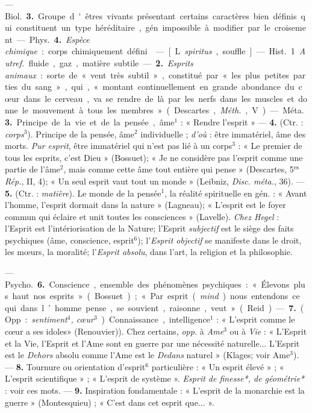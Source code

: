 \begin{itemize}[leftmargin=1cm, label=, itemsep=1pt]
— \si{Biol.} {\bf 3.} Groupe d'êtres vivants
présentant certains caractères bien
définis qui constituent un type
héréditaire, gén. impossible à modifier par le croisement.

— \si{Phys.} {\bf 4.} {\it Espèce chimique} :
corps chimiquement défini.

 — [L. {\it spiritus}, souffle] — \si{Hist.}
1. {\it Autref.} fluide, gaz, matière
subtile. — {\bf 2.} {\it Esprits animaux} : sorte
de « vent très subtil », constitué
par « les plus petites parties du
sang », qui, « montant continuellement en grande abondance du
cœur dans le cerveau, va se rendre
de là par les nerfs dans les muscles
et donne le mouvement à tous les
membres » (Descartes, {\it Méth.}, V).

— \si{Méta.} {\bf 3.} Principe de la vie et de
la pensée, âme$^1$ : « Rendre l'esprit »
— {\bf 4.} (Ctr. : {\it corps}$^3$). Principe de la
pensée, âme$^2$ individuelle ; {\it d'où} :
être immatériel, âme des morts.
{\it Pur esprit}, être immatériel qui n’est
pas lié à un corps$^3$ : « Le premier de
tous les esprits, c’est Dieu » (Bossuet); « Je ne considère pas l'esprit
comme une partie de l'âme$^2$, mais
comme cette âme tout entière qui
pense » (Descartes, 5$^\text{es}$ {\it Rép.}, II, 4);
« Un seul esprit vaut tout un monde »
(Leibniz, {\it Disc. méta.}, 36). — {\bf 5.} (Ctr. :
{\it matière}). Le monde de la pensée$^1$, la
réalité spirituelle en gén. : « Avant
l’homme, l'esprit dormait dans la
nature » (Lagneau); « L'esprit est
le foyer commun qui éclaire et unit
toutes les consciences » (Lavelle).
{\it Chez Hegel} : l'Esprit est l’intériorisation
de la Nature; l'Esprit {\it subjectif} est le siège des faits psychiques
(âme, conscience, esprit$^6$); l'{\it Esprit objectif} se manifeste
dans le droit, les mœurs, la moralité; l'{\it Esprit absolu}, dans l’art,
la religion et la philosophie.

— \si{Psycho.} {\bf 6.} Conscience, ensemble des phénomènes psychiques :
« Élevons plus haut nos esprits »
(Bossuet); « Par esprit ({\it mind}) nous
entendons ce qui dans l’homme
pense, se souvient, raisonne, veut »
(Reid). — {\bf 7.} (Opp. : {\it sentiment$^4$,
cœur$^3$}). Connaissance, intelligence$^1$ :
« L'esprit comme le cœur a ses idoles»
(Renouvier)). Chez certains, {\it opp.} à
{\it Ame}$^3$ ou à {\it Vie} : « L'Esprit et la Vie,
l'Esprit et l'Ame sont en guerre par
une nécessité naturelle... L'Esprit
est le {\it Dehors} absolu comme l’Ame
est le {\it Dedans} naturel » (Klages;
voir Ame$^3$). — {\bf 8.} Tournure ou orientation d’esprit$^6$
particulière : « Un esprit élevé » ; « L'esprit scientifique » ;
« L'esprit de système ». {\it Esprit de finesse*, de géométrie*} :
voir ces mots. — {\bf 9.} Inspiration fondamentale : « L’esprit de la
monarchie est la guerre » (Montesquieu) ; « C’est dans cet esprit que... ».


\end{itemize}
